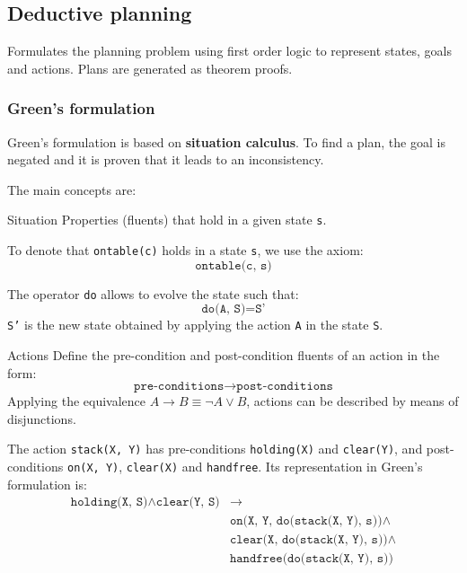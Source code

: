 \subsection{Deductive planning}
Formulates the planning problem using first order logic to represent states, goals and actions.
Plans are generated as theorem proofs.

\subsubsection{Green's formulation}
Green's formulation is based on \textbf{situation calculus}.
To find a plan, the goal is negated and it is proven that it leads to an inconsistency.

The main concepts are:
\begin{descriptionlist}
    \item[Situation]
        Properties (fluents) that hold in a given state \texttt{s}.
        \begin{example}
            To denote that \texttt{ontable(c)} holds in a state \texttt{s}, we use the axiom:
            \[ \texttt{ontable(c, s)} \]
        \end{example}
        The operator \texttt{do} allows to evolve the state such that:
        \[ \texttt{do(A, S)} = \texttt{S'} \]
        \texttt{S'} is the new state obtained by applying the action \texttt{A} in the state \texttt{S}.

    \item[Actions]
        Define the pre-condition and post-condition fluents of an action in the form:
        \[ \texttt{pre-conditions} \rightarrow \texttt{post-conditions} \]
        Applying the equivalence $A \rightarrow B \equiv \lnot A \vee B$, actions can be described by means of disjunctions.
        \begin{example}
            The action \texttt{stack(X, Y)} has pre-conditions \texttt{holding(X)} and \texttt{clear(Y)}, and
            post-conditions \texttt{on(X, Y)}, \texttt{clear(X)} and \texttt{handfree}.
            Its representation in Green's formulation is:
            \[
                \begin{split}
                    \texttt{holding(X, S)} \land \texttt{clear(Y, S)} &\rightarrow \\
                    &\texttt{on(X, Y, do(stack(X, Y), s))} \land \\
                    &\texttt{clear(X, do(stack(X, Y), s))} \land \\
                    &\texttt{handfree(do(stack(X, Y), s))} \\
                \end{split}
            \]
        \end{example}


\end{descriptionlist}
